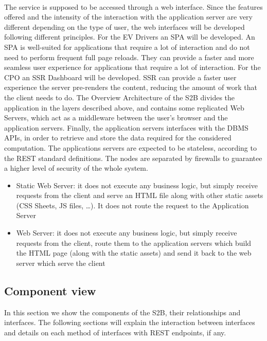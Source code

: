 \hfill \\
The service is supposed to be accessed through a web interface.
Since the features offered and the intensity of the interaction with the application server
are very different depending on the type of user, the web interfaces will be developed following
different principles.
For the EV Drivers an SPA will be developed. An SPA is well-suited for applications
that require a lot of interaction and do not need to perform frequent full page reloads.
They can provide a faster and more seamless user experience for applications that require a
lot of interaction.
For the CPO an SSR Dashboard will be developed. SSR can provide a faster user experience
the server pre-renders the content, reducing the amount of work that the client needs to do.
The Overview Architecture of the S2B divides the application in the layers described
above, and contains some replicated Web Servers, which act as a middleware
between the user's browser and the application servers.
Finally, the application servers interfaces with the DBMS APIs, in order
to retrieve and store the data required for the considered computation.
The applications servers are expected to be stateless, according to the
REST standard definitions. The nodes are separated by firewalls to guarantee a higher level of security
of the whole system.

\begin{itemize}
    \item Static Web Server: it does not execute any business logic, but simply receive requests from the client and serve an HTML file along with other static assets (CSS Sheets, JS files, \dots).
          It does not route the request to the Application Server
    \item Web Server: it does not execute any business logic, but simply receive requests from the client, route
          them to the application servers which build the HTML page (along with the static assets) and send it back to the web server which serve the client
\end{itemize}
\pagebreak
\subsection{Component view}
In this section we show the components of the S2B, their relationships and interfaces. The following sections will explain the interaction between interfaces and details on each method of interfaces with REST endpoints, if any.

